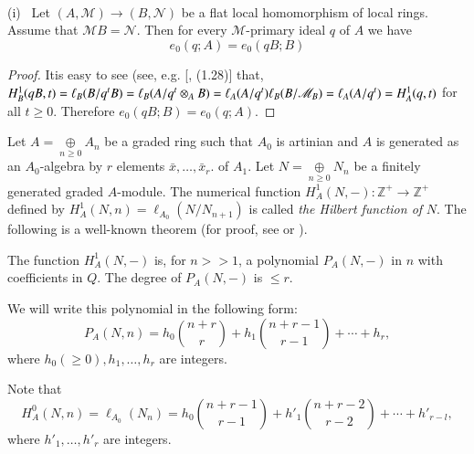 \begin{remark*}
~

  (i)~ Let $(A, \mathscr{M})\to (B, \mathscr{N})$ be a flat local
  homomorphism of local rings. Assume that
  $\mathscr{M}B=\mathscr{N}$. Then for every $\mathscr{M}$-primary
  ideal $q$ of $A$ we have  
  $$
  e_0(q;A)=e_0(qB;B)
  $$
\end{remark*}


\begin{proof}
It\pageoriginale is easy to see (see, e.g. [\cite{34}, (1.28)] that, $H^1_B(qB,t)=
  \ell_B\break (B/q^tB)=\ell _B(A/q^t\otimes_A B)=\ell_A(A/q^t) \ell_B
  (B/\mathscr{M}_B)=\ell_A(A/q^t)=H^1_A(q,t)$ for all $t \geq
  0$. Therefore $e_0(qB;B)=e_0(q;A)$.  
\end{proof}

Let $A=\underset{n\geq 0}{\oplus} A_n $ be a graded ring such that
$A_0$ is artinian and $A$ is generated as an $A_0$-algebra by $r$
elements $\bar{x},\ldots,\bar{x}_r$. of $A_1$. Let $N=\underset{n\geq
  0}{\oplus} N_n $ be a finitely generated graded $A$-module. The
numerical function $H^1_A(N,-):\mathbb{Z}^+\to \mathbb{Z}^+$ defined
by $H^1_A(N,n)=\ell_{A_0}(N/N_{n+1})$ is called \textit{the Hilbert
  function of} $N$. The following is a well-known theorem (for proof,
see \cite{55} or \cite{72}).  

\begin{theorem*}[HILBERT] 
  The function  $H^1_A (N,-) $ is, for $n
  >> 1$, a polynomial $ P_A (N,-)$ in $n$
  with coefficients in  $Q$. The degree of 
  $P_A(N,-)$ is $\leq r$. 
  
  We will write this polynomial in the following form: 
  $$
  P_A(N,n)= h_0 \binom{n+r}{r}+ h_1\binom{n+r-1}{r-1}+\cdots+h_r, 
  $$ 
  where $h_0(\geq 0), h_1,\ldots,h_r$ are integers. 
\end{theorem*}

Note that 
$$
H^0_A(N,n)=\ell_{A_0}(N_n)= h_0 \binom{n+r-1}{r-1} + h'_1 
\binom{n+r-2}{r-2}+\cdots+h'_{r-l},
$$
where $h'_1, \ldots, h'_r$ are integers. 

